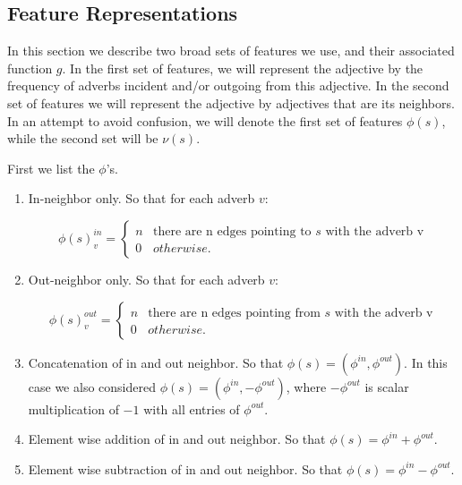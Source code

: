 \subsection{Feature Representations}

In this section we describe two broad sets of features we use, and their associated function $g$. In the first set of features, we will represent the adjective by the frequency of adverbs incident and/or outgoing from this adjective. In the second set of features we will represent the adjective by adjectives that are its neighbors. In an attempt to avoid confusion, we will denote the first set of features $\phi(s)$, while the second set will be $\nu(s)$.

First we list the $\phi$'s.

\begin{enumerate}
	\item In-neighbor only. So that for each adverb $v$:

		\[   
		\phi(s)^{in}_v = \left\{
		\begin{array}{ll}
		      n & \text{there are n edges pointing to $s$ with the adverb v} \\
		      0 & otherwise.
		\end{array} 
		\right.
		\]

	\item Out-neighbor only. So that for each adverb $v$:

		\[   
		\phi(s)^{out}_v = \left\{
		\begin{array}{ll}
		      n & \text{there are n edges pointing from $s$ with the adverb v} \\
		      0 & otherwise.
		\end{array} 
		\right. 
		\]

	\item Concatenation of in and out neighbor. So that $\phi(s) = (\phi^{in}, \phi^{out})$. In this case we also considered $\phi(s) = (\phi^{in}, - \phi^{out})$, where $- \phi^{out}$ is scalar multiplication of $-1$ with all entries of $\phi^{out}$.

	\item Element wise addition of in and out neighbor. So that $\phi(s) = \phi^{in} + \phi^{out}$.
	
	\item Element wise subtraction of in and out neighbor. So that $\phi(s) = \phi^{in} - \phi^{out}$.

\end{enumerate}

